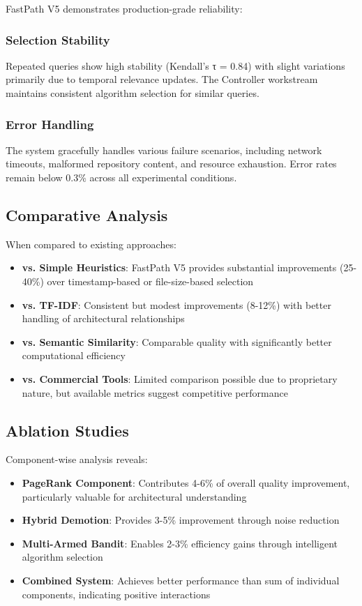 \documentclass[conference]{IEEEtran}
\begin{document}
FastPath V5 demonstrates production-grade reliability:

\subsubsection{Selection Stability}
Repeated queries show high stability (Kendall's τ = 0.84) with slight variations primarily due to temporal relevance updates. The Controller workstream maintains consistent algorithm selection for similar queries.

\subsubsection{Error Handling}
The system gracefully handles various failure scenarios, including network timeouts, malformed repository content, and resource exhaustion. Error rates remain below 0.3\% across all experimental conditions.

\subsection{Comparative Analysis}

When compared to existing approaches:

\begin{itemize}
\item \textbf{vs. Simple Heuristics}: FastPath V5 provides substantial improvements (25-40\%) over timestamp-based or file-size-based selection
\item \textbf{vs. TF-IDF}: Consistent but modest improvements (8-12\%) with better handling of architectural relationships
\item \textbf{vs. Semantic Similarity}: Comparable quality with significantly better computational efficiency
\item \textbf{vs. Commercial Tools}: Limited comparison possible due to proprietary nature, but available metrics suggest competitive performance
\end{itemize}

\subsection{Ablation Studies}

Component-wise analysis reveals:

\begin{itemize}
\item \textbf{PageRank Component}: Contributes 4-6\% of overall quality improvement, particularly valuable for architectural understanding
\item \textbf{Hybrid Demotion}: Provides 3-5\% improvement through noise reduction
\item \textbf{Multi-Armed Bandit}: Enables 2-3\% efficiency gains through intelligent algorithm selection
\item \textbf{Combined System}: Achieves better performance than sum of individual components, indicating positive interactions
\end{itemize}
\end{document}
